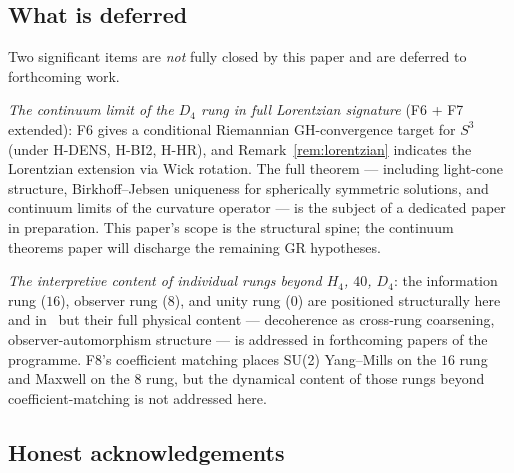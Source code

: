 \documentclass[12pt]{article}
\theoremstyle{definition}
\theoremstyle{remark}
\begin{document}
\subsection{What is deferred}

Two significant items are \emph{not} fully closed by this paper and are deferred to forthcoming work.

\emph{The continuum limit of the $D_4$ rung in full Lorentzian signature} (F6 + F7 extended): F6 gives a conditional Riemannian GH-convergence target for $S^3$ (under H-DENS, H-BI2, H-HR), and Remark~\ref{rem:lorentzian} indicates the Lorentzian extension via Wick rotation. The full theorem --- including light-cone structure, Birkhoff--Jebsen uniqueness for spherically symmetric solutions, and continuum limits of the curvature operator --- is the subject of a dedicated paper in preparation. This paper's scope is the structural spine; the continuum theorems paper will discharge the remaining GR hypotheses.

\emph{The interpretive content of individual rungs beyond $H_4$, $40$, $D_4$}: the information rung ($16$), observer rung ($8$), and unity rung ($0$) are positioned structurally here and in~\citep{SmartXXXV} but their full physical content --- decoherence as cross-rung coarsening, observer-automorphism structure --- is addressed in forthcoming papers of the programme. F8's coefficient matching places SU(2) Yang--Mills on the $16$ rung and Maxwell on the $8$ rung, but the dynamical content of those rungs beyond coefficient-matching is not addressed here.

\subsection{Honest acknowledgements}
\end{document}

